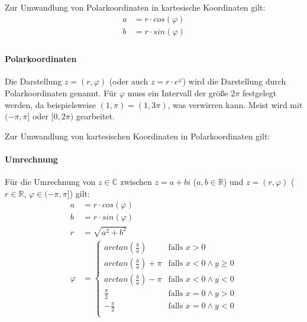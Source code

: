 				Zur Umwandlung von Polarkoordinaten in kartesische Koordinaten gilt:
				\begin{align*}
					a & = r \cdot cos(\varphi) \\
					b & = r \cdot sin(\varphi) \\
				\end{align*}

			\paragraph{Polarkoordinaten}
				Die Darstellung $ z = (r, \varphi) $ (oder auch $ z = r \cdot e ^ \varphi $) wird die Darstellung durch Polarkoordinaten genannt. Für $ \varphi $ muss ein Intervall der größe $ 2\pi $ festgelegt werden, da beispielsweise $ (1, \pi) = (1, 3\pi) $, was verwirren kann. Meist wird mit $ (-\pi, \pi] $ oder $ [0, 2\pi) $ gearbeitet.

				Zur Umwandlung von kartesischen Koordinaten in Polarkoordinaten gilt:

			\paragraph{Umrechnung}
				Für die Umrechnung von $ z \in \mathbb{C} $ zwischen $ z = a + bi $ ($ a, b \in \mathbb{R} $) und $ z = (r, \varphi) $ ($ r \in \mathbb{R} $, $ \varphi \in (-\pi, \pi] $) gilt:
				\begin{align*}
					a       & = r \cdot cos(\varphi) \\
					b       & = r \cdot sin(\varphi) \\
					r       & = \sqrt{a ^ 2 + b ^ 2} \\
					\varphi & =
					\begin{cases}
						arctan(\frac{b}{a})       & \text{falls } x > 0                \\
						arctan(\frac{b}{a}) + \pi & \text{falls } x < 0 \land y \geq 0 \\
						arctan(\frac{b}{a}) - \pi & \text{falls } x < 0 \land y < 0    \\
						\frac{\pi}{2}             & \text{falls } x = 0 \land y > 0    \\
						-\frac{\pi}{2}            & \text{falls } x = 0 \land y < 0    \\
					\end{cases}
				\end{align*}
